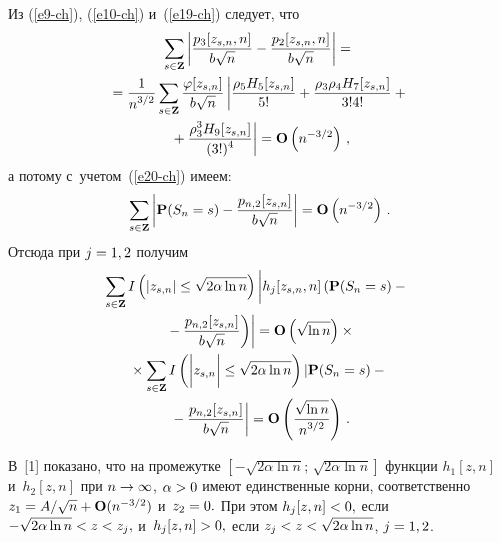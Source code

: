 \begin{multicols}{2}
 Из (\ref{e9-ch}), (\ref{e10-ch}) и~(\ref{e19-ch}) следует, что
 \begin{multline*}
 \sum\limits_{s\in \mathbf{Z}}
 \left|\displaystyle\frac{\displaystyle p_3[z_{s,n},n]\mathstrut}{\displaystyle b\sqrt{n}\mathstrut}-\displaystyle\frac{\displaystyle p_2[z_{s,n},n]\mathstrut}{\displaystyle b\sqrt{n}\mathstrut}\right|
 ={}\\
 {}=\displaystyle\frac{\displaystyle 1\mathstrut}{\displaystyle n^{3/2}\mathstrut} \sum\limits_{s\in \mathbf{Z}} \displaystyle\frac{\displaystyle \varphi[z_{s,n}]\mathstrut}{\displaystyle b\sqrt{n}\mathstrut}
 \left\vert\displaystyle\frac{\displaystyle \rho_5 H_5[z_{s,n}]\mathstrut}{\displaystyle 5!\mathstrut}+\displaystyle\frac{\displaystyle \rho_3 \rho_4 H_7[z_{s,n}]\mathstrut}{\displaystyle 3!4!\mathstrut}+{}\right.\\
\left. {}+
 \displaystyle\frac{\displaystyle \rho_3^3 H_9[z_{s,n}]\mathstrut}{\displaystyle (3!)^4\mathstrut} \right\vert
 =\mathbf{O}\left(n^{-3/2}\right)\,,
 \end{multline*}
а потому с~учетом~(\ref{e20-ch}) имеем:
 \begin{equation}
 \sum\limits_{s\in \mathbf{Z}} \left|\mathbf{P}(S_n=s)-
 \displaystyle\frac{\displaystyle p_{n,2}[z_{s,n}]\mathstrut}{\displaystyle b\sqrt{n}\mathstrut}
 \right| =\mathbf{O}\left(n^{-3/2}\right)\,.
 \label{e21-ch}
 \end{equation}
 Отсюда при $j\hm=1,2$ получим
 \begin{multline} 
 \hspace*{-0.84pt}\sum\limits_{s\in \mathbf{Z}}
 I\left( \left| z_{s,n}\right| \le \sqrt {2\alpha \ln n} \right)
 \left| 
 \vphantom{\fr{p_{n,2}[z_{s,n}]}{b\sqrt{n}}}
 h_j[z_{s,n},n]
 \left(\mathbf{P}(S_n=s)-{}\right.\right.\\
\left.\left. {}-\fr{p_{n,2}[z_{s,n}]}{b\sqrt{n}}\right)\right|=
\mathbf{O}\left(\sqrt{\ln n}\right)\times{}\\
{}\times
 \sum\limits_{s\in \mathbf{Z}}
 I\left( \left| 
 \vphantom{\fr{p_{n,2}[z_{s,n}]}{b\sqrt{n}}}
 z_{s,n}\right| \le \sqrt {2\alpha \ln n} \right)
 \left|\mathbf{P}(S_n=s)-{}\right.\\
\left. {}-\fr{p_{n,2}[z_{s,n}]}{b\sqrt{n}}\right|
 =\mathbf{O}\left(\fr{\sqrt{\ln n}} {n^{3/2}}\right)\,.
  \label{e22-ch}
 \end{multline}

 В~[1] показано, что на промежутке $[-\sqrt {2\alpha \ln n};\,\sqrt {2\alpha \ln n}]$
 функции  $h_1[z,n]$ и~$h_2[z,n]$ при $n\hm\to\infty$, $\alpha\hm>0$
 имеют единственные корни, соответственно $z_{1}\hm=A/\sqrt{n}\hm+\mathbf{O}(n^{-3/2})$
 и~$z_{2}\hm=0.$
 При этом $h_j[z,n]\hm<0,$ если $-\sqrt {2\alpha \ln n}\hm<z\hm<z_{j},$ и~$h_j[z,n]\hm>0,$
 если $z_{j}\hm<z\hm<\sqrt {2\alpha \ln n}$, $j\hm=1,2$.


\end{multicols}
